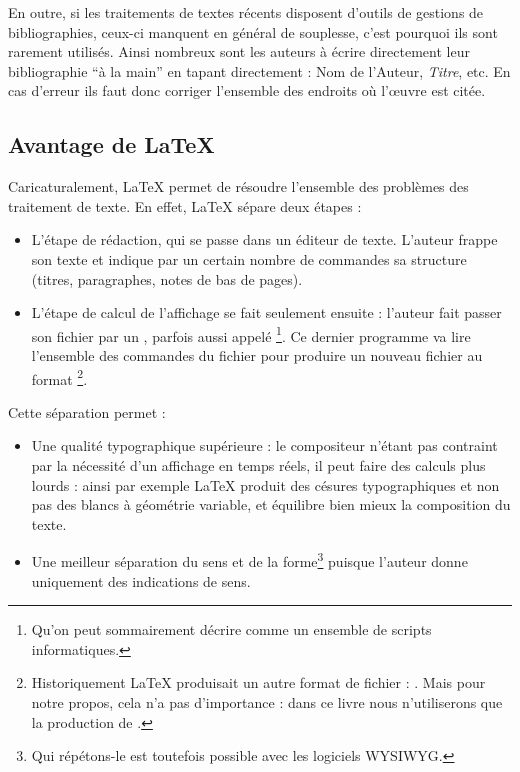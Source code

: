 En outre, si les traitements de textes récents disposent d'outils de gestions de bibliographies, ceux-ci manquent en général de souplesse, c'est pourquoi ils sont rarement utilisés. Ainsi nombreux sont les auteurs à écrire directement leur bibliographie \enquote{à la main} en tapant directement : Nom de l'Auteur, \emph{Titre}, etc. En cas d'erreur ils faut donc corriger l'ensemble des endroits où l'œuvre est citée.

\subsection{Avantage de \LaTeX{}}

Caricaturalement, \LaTeX{} permet de résoudre l'ensemble des problèmes des traitement de texte. En effet, \LaTeX{} sépare deux étapes : 

\begin{itemize}
\item L'étape de rédaction, qui se passe dans un éditeur de texte. L'auteur frappe son texte et indique par un certain nombre de commandes sa structure (titres, paragraphes, notes de bas de pages).
\item L'étape de calcul de l'affichage se fait seulement ensuite : l'auteur fait passer son fichier par un , parfois aussi appelé \footnote{Qu'on peut sommairement décrire comme un ensemble de scripts informatiques.}. Ce dernier programme va lire l'ensemble des commandes du fichier pour produire un nouveau fichier au format \footnote{Historiquement \LaTeX{} produisait un autre format de fichier : . Mais pour notre propos, cela n'a pas d'importance : dans ce livre nous n'utiliserons que la production de .}.
\end{itemize}

Cette séparation permet :
\begin{itemize}
\item Une qualité typographique supérieure :  le compositeur n'étant pas contraint par la nécessité d'un affichage en temps réels, il peut faire des calculs plus lourds : ainsi par exemple \LaTeX{} produit des césures typographiques et non pas des blancs à géométrie variable, et équilibre bien mieux la composition du texte.
\item Une meilleur séparation du sens et de la forme\footnote{Qui répétons-le est toutefois possible avec les logiciels WYSIWYG.} puisque l'auteur donne uniquement des indications de sens.
\end{itemize}

